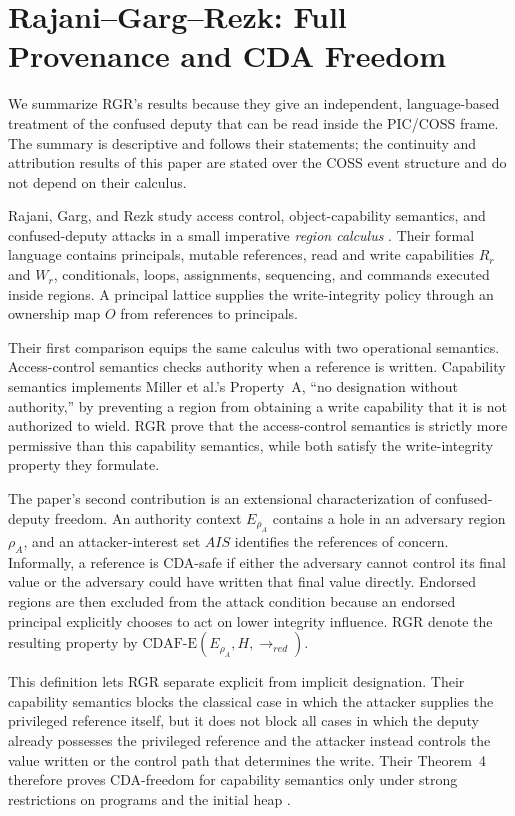 \documentclass[10pt,twocolumn]{article}
\newcommand{\Model}{\textnormal{\textsc{COSS}}\xspace}
\newcommand{\CDAF}{\mathrm{CDAF\text{-}E}}
\begin{document}
\section{Rajani--Garg--Rezk: Full Provenance and CDA Freedom}
\label{sec:rgr}

We summarize RGR's results because they give an independent, language-based
treatment of the confused deputy that can be read inside the PIC/\Model frame.
The summary is descriptive and follows their statements; the continuity and
attribution results of this paper are stated over the \Model event structure
and do not depend on their calculus.

Rajani, Garg, and Rezk study access control, object-capability semantics, and
confused-deputy attacks in a small imperative \emph{region calculus}
\cite{rajani_garg_rezk2016}. Their formal language contains principals,
mutable references, read and write capabilities $R_r$ and $W_r$, conditionals,
loops, assignments, sequencing, and commands executed inside regions. A
principal lattice supplies the write-integrity policy through an ownership map
$O$ from references to principals.

Their first comparison equips the same calculus with two operational semantics.
Access-control semantics checks authority when a reference is written.
Capability semantics implements Miller et al.'s Property~A, ``no designation
without authority,'' by preventing a region from obtaining a write capability
that it is not authorized to wield. RGR prove that the access-control semantics
is strictly more permissive than this capability semantics, while both satisfy
the write-integrity property they formulate.

The paper's second contribution is an extensional characterization of
confused-deputy freedom. An authority context $E_{\rho_A}$ contains a hole in
an adversary region $\rho_A$, and an attacker-interest set $AIS$ identifies the
references of concern. Informally, a reference is CDA-safe if either the
adversary cannot control its final value or the adversary could have written
that final value directly. Endorsed regions are then excluded from the attack
condition because an endorsed principal explicitly chooses to act on lower
integrity influence. RGR denote the resulting property by
$\CDAF(E_{\rho_A},H,\to_{red})$.

This definition lets RGR separate explicit from implicit designation. Their
capability semantics blocks the classical case in which the attacker supplies
the privileged reference itself, but it does not block all cases in which the
deputy already possesses the privileged reference and the attacker instead
controls the value written or the control path that determines the write.
Their Theorem~4 therefore proves CDA-freedom for capability semantics only
under strong restrictions on programs and the initial heap
\cite{rajani_garg_rezk2016}.
\end{document}
